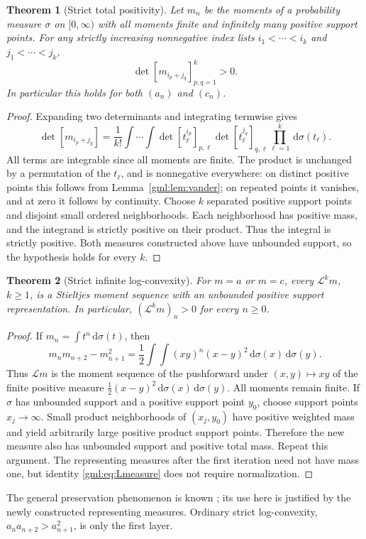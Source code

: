 \documentclass[11pt]{article}
\numberwithin{equation}{section}
\newtheorem{theorem}{Theorem}[section]
\theoremstyle{definition}
\theoremstyle{remark}
\newcommand{\dd}{\,\mathrm d}
\newcommand{\LL}{\mathcal L}
\begin{document}
\begin{theorem}[Strict total positivity]\label{gml:thm:hankel}
Let $m_n$ be the moments of a probability measure $\sigma$ on $[0,\infty)$
with all moments finite and infinitely many positive support points. For
any strictly increasing nonnegative index lists $i_1<\cdots<i_k$ and
$j_1<\cdots<j_k$,
\begin{equation}\label{gml:eq:minor}
 \det[m_{i_p+j_q}]_{p,q=1}^k>0.
\end{equation}
In particular this holds for both $(a_n)$ and $(c_n)$.
\end{theorem}
\begin{proof}
Expanding two determinants and integrating termwise gives
\begin{equation}\label{gml:eq:andreief}
 \det[m_{i_p+j_q}]=\frac1{k!}
 \int\cdots\int
  \det[t_\ell^{i_p}]_{p,\ell}
  \det[t_\ell^{j_q}]_{q,\ell}
  \prod_{\ell=1}^k\dd\sigma(t_\ell).
\end{equation}
All terms are integrable since all moments are finite. The product is
unchanged by a permutation of the $t_\ell$, and is nonnegative everywhere:
on distinct positive points this follows from Lemma~\ref{gml:lem:vander};
on repeated points it vanishes, and at zero it follows by continuity.
Choose $k$ separated positive support points and disjoint small ordered
neighborhoods. Each neighborhood has positive mass, and the integrand is
strictly positive on their product. Thus the integral is strictly positive.
Both measures constructed above have unbounded support, so the hypothesis
holds for every $k$.
\end{proof}

\begin{theorem}[Strict infinite log-convexity]\label{gml:thm:infiniteLC}
For $m=a$ or $m=c$, every $\LL^k m$, $k\ge1$, is a Stieltjes moment
sequence with an unbounded positive support representation. In particular,
$(\LL^k m)_n>0$ for every $n\ge0$.
\end{theorem}
\begin{proof}
If $m_n=\int t^n\dd\sigma(t)$, then
\begin{equation}\label{gml:eq:Lmeasure}
 m_nm_{n+2}-m_{n+1}^2
 =\frac12\int\!\int (xy)^n(x-y)^2\dd\sigma(x)\dd\sigma(y).
\end{equation}
Thus $\LL m$ is the moment sequence of the pushforward under
$(x,y)\mapsto xy$ of the finite positive measure
$\tfrac12(x-y)^2\dd\sigma(x)\dd\sigma(y)$. All moments remain finite.
If $\sigma$ has unbounded support and a positive support point $y_0$,
choose support points $x_j\to\infty$. Small product neighborhoods of
$(x_j,y_0)$ have positive weighted mass and yield arbitrarily large
positive product support points. Therefore the new measure also has
unbounded support and positive total mass. Repeat this argument.
The representing measures after the first iteration need not have mass
one, but identity \eqref{gml:eq:Lmeasure} does not require normalization.
\end{proof}
The general preservation phenomenon is known \cite{wangzhu}; its use here
is justified by the newly constructed representing measures. Ordinary
strict log-convexity, $a_na_{n+2}>a_{n+1}^2$, is only the first layer.
\end{document}
